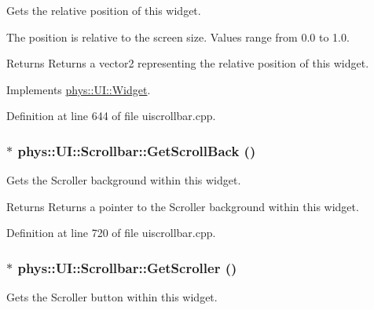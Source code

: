 Gets the relative position of this widget. 

The position is relative to the screen size. Values range from 0.0 to 1.0. \begin{DoxyReturn}{Returns}
Returns a vector2 representing the relative position of this widget. 
\end{DoxyReturn}


Implements \hyperlink{classphys_1_1UI_1_1Widget_a3e464b028b0d1b5755923b8790260c33}{phys::UI::Widget}.



Definition at line 644 of file uiscrollbar.cpp.

\hypertarget{classphys_1_1UI_1_1Scrollbar_a1c24fbb88f9d86aff1b2f0abc033116a}{
\subsubsection[{GetScrollBack}]{ $\ast$ phys::UI::Scrollbar::GetScrollBack ()}}
\label{d0/d3e/classphys_1_1UI_1_1Scrollbar_a1c24fbb88f9d86aff1b2f0abc033116a}


Gets the Scroller background within this widget. 

\begin{DoxyReturn}{Returns}
Returns a pointer to the Scroller background within this widget. 
\end{DoxyReturn}


Definition at line 720 of file uiscrollbar.cpp.

\hypertarget{classphys_1_1UI_1_1Scrollbar_a28024d2f3a017e4ed3c2a4df62a1e8be}{
\subsubsection[{GetScroller}]{ $\ast$ phys::UI::Scrollbar::GetScroller ()}}
\label{d0/d3e/classphys_1_1UI_1_1Scrollbar_a28024d2f3a017e4ed3c2a4df62a1e8be}


Gets the Scroller button within this widget. 

